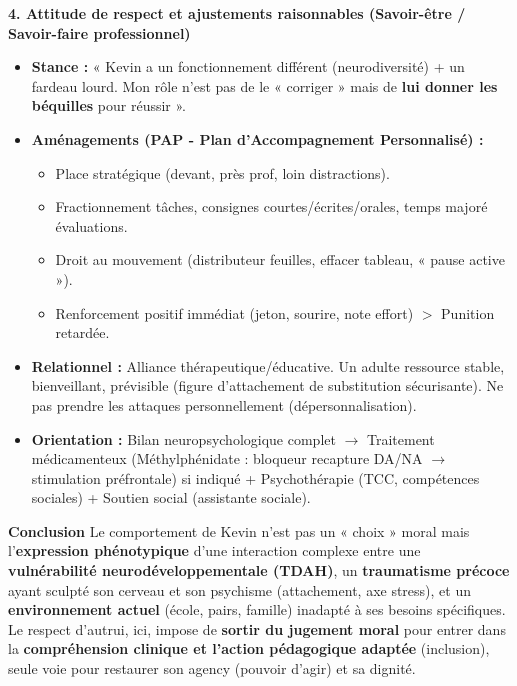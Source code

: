\documentclass[11pt]{article}
\begin{document}
\begin{exoresolu}
\textbf{4. Attitude de respect et ajustements raisonnables (Savoir-être / Savoir-faire professionnel)}
\begin{itemize}
    \item \textbf{Stance :} « Kevin a un fonctionnement différent (neurodiversité) + un fardeau lourd. Mon rôle n'est pas de le « corriger » mais de \textbf{lui donner les béquilles} pour réussir ».
    \item \textbf{Aménagements (PAP - Plan d'Accompagnement Personnalisé) :}
    \begin{itemize}
        \item Place stratégique (devant, près prof, loin distractions).
        \item Fractionnement tâches, consignes courtes/écrites/orales, temps majoré évaluations.
        \item Droit au mouvement (distributeur feuilles, effacer tableau, « pause active »).
        \item Renforcement positif immédiat (jeton, sourire, note effort) $>$ Punition retardée.
    \end{itemize}
    \item \textbf{Relationnel :} Alliance thérapeutique/éducative. Un adulte ressource stable, bienveillant, prévisible (figure d'attachement de substitution sécurisante). Ne pas prendre les attaques personnellement (dépersonnalisation).
    \item \textbf{Orientation :} Bilan neuropsychologique complet $\to$ Traitement médicamenteux (Méthylphénidate : bloqueur recapture DA/NA $\to$ stimulation préfrontale) si indiqué + Psychothérapie (TCC, compétences sociales) + Soutien social (assistante sociale).
\end{itemize}

\textbf{Conclusion}
Le comportement de Kevin n'est pas un « choix » moral mais l'\textbf{expression phénotypique} d'une interaction complexe entre une \textbf{vulnérabilité neurodéveloppementale (TDAH)}, un \textbf{traumatisme précoce} ayant sculpté son cerveau et son psychisme (attachement, axe stress), et un \textbf{environnement actuel} (école, pairs, famille) inadapté à ses besoins spécifiques. Le respect d'autrui, ici, impose de \textbf{sortir du jugement moral} pour entrer dans la \textbf{compréhension clinique et l'action pédagogique adaptée} (inclusion), seule voie pour restaurer son agency (pouvoir d'agir) et sa dignité.
\end{exoresolu}
\end{document}
